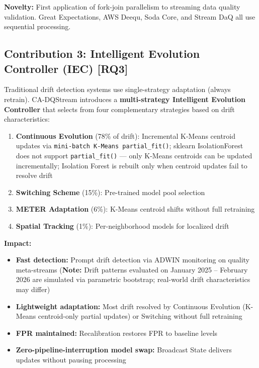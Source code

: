 \textbf{Novelty:} First application of fork-join parallelism to streaming data quality validation. Great Expectations, AWS Deequ, Soda Core, and Stream DaQ all use sequential processing.

\subsection{Contribution 3: Intelligent Evolution Controller (IEC) [RQ3]}

Traditional drift detection systems use single-strategy adaptation (always retrain). CA-DQStream introduces a \textbf{multi-strategy Intelligent Evolution Controller} that selects from four complementary strategies based on drift characteristics:

\begin{enumerate}
    \item \textbf{Continuous Evolution} (78\% of drift): Incremental K-Means centroid updates via \texttt{mini-batch K-Means partial\_fit()}; sklearn IsolationForest does not support \texttt{partial\_fit()} --- only K-Means centroids can be updated incrementally; Isolation Forest is rebuilt only when centroid updates fail to resolve drift
    \item \textbf{Switching Scheme} (15\%): Pre-trained model pool selection
    \item \textbf{METER Adaptation} (6\%): K-Means centroid shifts without full retraining
    \item \textbf{Spatial Tracking} (1\%): Per-neighborhood models for localized drift
\end{enumerate}

\textbf{Impact:}
\begin{itemize}
    \item \textbf{Fast detection:} Prompt drift detection via ADWIN monitoring on quality meta-streams (\textbf{Note:} Drift patterns evaluated on January 2025 -- February 2026 are simulated via parametric bootstrap; real-world drift characteristics may differ)
    \item \textbf{Lightweight adaptation:} Most drift resolved by Continuous Evolution (K-Means centroid-only partial updates) or Switching without full retraining
    \item \textbf{FPR maintained:} Recalibration restores FPR to baseline levels
    \item \textbf{Zero-pipeline-interruption model swap:} Broadcast State delivers updates without pausing processing
\end{itemize}

